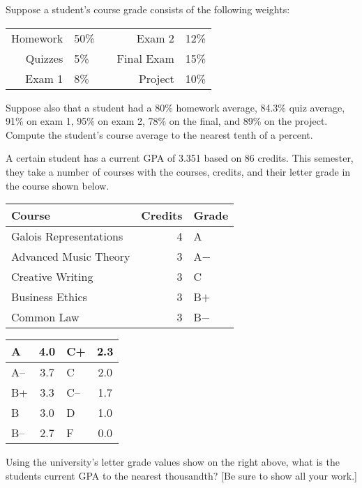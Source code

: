 \documentclass[12pt,letterpaper]{exam}
\begin{document}
\begin{questions}



\newpage
\question[10] Suppose a student's course grade consists of the following weights: \par
	\begin{table}[!ht]
	\centering
	\begin{tabular}{rlcrl}
	Homework & 50\% & & Exam 2 & 12\% \\
	Quizzes & 5\% & & Final Exam & 15\% \\
	Exam 1 & 8\% & & Project & 10\% \\
	\end{tabular}
	\end{table} \par
Suppose also that a student had a 80\% homework average, 84.3\% quiz average, 91\% on exam 1, 95\% on exam 2, 78\% on the final, and 89\% on the project. Compute the student's course average to the nearest tenth of a percent. 



\newpage
\question[10] A certain student has a current GPA of 3.351 based on 86 credits. This semester, they take a number of courses with the courses, credits, and their letter grade in the course shown below. \par
	\begin{table}[!ht]
	\centering
	\begin{tabular}{lrl}
	Course & Credits & Grade \\ \hline
	Galois Representations & 4 & A \\
	Advanced Music Theory & 3 & A$-$ \\
	Creative Writing & 3 & C \\
	Business Ethics & 3 & B$+$ \\
	Common Law & 3 & B$-$
	\end{tabular} \hspace{1cm}
        \begin{tabular}{|l||c|l||c|} \hline
        A & 4.0 & C+ & 2.3 \\ \hline
        A-- & 3.7 & C & 2.0 \\ \hline
        B+ & 3.3 & C-- & 1.7 \\ \hline
        B & 3.0 & D & 1.0 \\ \hline
        B-- & 2.7 & F & 0.0 \\ \hline
        \end{tabular}
	\end{table} \par
Using the university's letter grade values show on the right above, what is the students current GPA to the nearest thousandth? [Be sure to show all your work.]




\end{questions}
\end{document}
